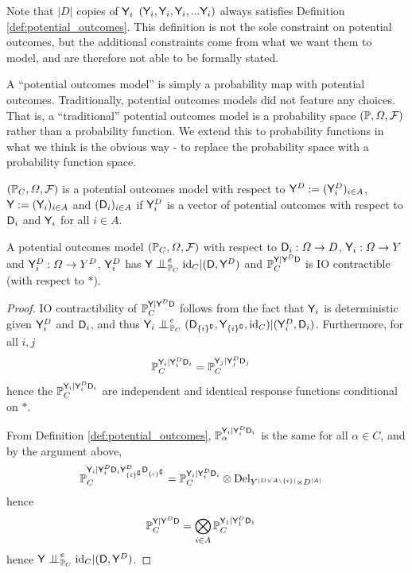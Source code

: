 Note that $|D|$ copies of $\mathsf{Y}_i$ $(\mathsf{Y}_i,\mathsf{Y}_i,\mathsf{Y}_i,...\mathsf{Y}_i)$ always satisfies Definition \ref{def:potential_outcomes}. This definition is not the sole constraint on potential outcomes, but the additional constraints come from what we want them to model, and are therefore not able to be formally stated.

A ``potential outcomes model'' is simply a probability map with potential outcomes. Traditionally, potential outcomes models did not feature any choices. That is, a ``traditional'' potential outcomes model is a probability space $(\mathbb{P},\Omega,\mathcal{F})$ rather than a probability function. We extend this to probability functions in what we think is the obvious way - to replace the probability space with a probability function space.

\begin{definition}
$(\mathbb{P}_C,\Omega,\mathcal{F})$ is a potential outcomes model with respect to $\mathsf{Y}^D:=(\mathsf{Y}^D_i)_{i\in A}$, $\mathsf{Y}:=(\mathsf{Y}_i)_{i\in A}$ and $(\mathsf{D}_i)_{i\in A}$ if $\mathsf{Y}^D_i$ is a vector of potential outcomes with respect to $\mathsf{D}_i$ and $\mathsf{Y}_i$ for all $i\in A$.
\end{definition}

\begin{theorem}
A potential outcomes model $(\mathbb{P}_C,\Omega,\mathcal{F})$ with respect to $\mathsf{D}_i:\Omega\to D$, $\mathsf{Y}_i:\Omega\to Y$ and $\mathsf{Y}^D_i:\Omega\to Y^D$, $\mathsf{Y}^D_i$ has $\RV{Y}\CI_{\prob{P}_C}^e\text{id}_C|(\RV{D},\RV{Y}^D)$ and $\mathbb{P}_C^{\mathsf{Y}|\mathsf{Y}^D\mathsf{D}}$ is IO contractible (with respect to $*$).
\end{theorem}

\begin{proof}
IO contractibility of $\mathbb{P}_C^{\mathsf{Y}|\mathsf{Y}^D\mathsf{D}}$ follows from the fact that $\mathsf{Y}_i$ is deterministic given $\mathsf{Y}^D_i$ and $\mathsf{D}_i$, and thus $\RV{Y}_i\CI^e_{\prob{P}_C} (\RV{D}_{\{i\}^{\complement}},\RV{Y}_{\{i\}^{\complement}},\text{id}_C)|(\RV{Y}^D_{i},\RV{D}_i)$. Furthermore, for all $i,j$
\begin{align}
    \mathbb{P}_C^{\mathsf{Y}_i|\mathsf{Y}^D_i\mathsf{D}_i} &= \mathbb{P}_C^{\mathsf{Y}_j|\mathsf{Y}^D_j\mathsf{D}_j}
\end{align}
hence the $\mathbb{P}_C^{\mathsf{Y}_i|\mathsf{Y}^D_i\mathsf{D}_i}$ are independent and identical response functions conditional on $*$.

From Definition \ref{def:potential_outcomes}, $\mathbb{P}_\alpha^{\mathsf{Y}_i|\mathsf{Y}^D_i\mathsf{D}_i}$ is the same for all $\alpha\in C$, and by the argument above,
\begin{align}
    \mathbb{P}_C^{\mathsf{Y}_i|\mathsf{Y}^D_i\mathsf{D}_i\mathsf{Y}^D_{\{i\}^{\complement}}\mathsf{D}_{\{i\}^{\complement}}} &= \mathbb{P}_C^{\mathsf{Y}_i|\mathsf{Y}^D_i\mathsf{D}_i}\otimes \mathrm{Del}_{Y^{|D\times A\setminus\{i\}|}\times D^{|A|}}
\end{align}
hence
\begin{align}
    \mathbb{P}_C^{\mathsf{Y}|\mathsf{Y}^D\mathsf{D}} &= \bigotimes_{i\in A} \mathbb{P}_C^{\mathsf{Y}_1|\mathsf{Y}^D_1\mathsf{D}_1}
\end{align}
hence $\RV{Y}\CI_{\prob{P}_C}^e\text{id}_C|(\RV{D},\RV{Y}^D)$.
\end{proof}

